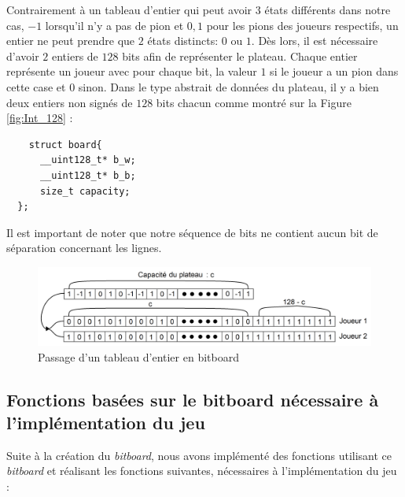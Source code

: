 \documentclass[a4paper,11pt]{article}
\begin{document}
\bigbreak

Contrairement à un tableau d'entier qui peut avoir $3$ états différents dans notre cas, $-1$ lorsqu'il n'y a pas de pion et $0,1$ pour les pions des joueurs respectifs, un entier ne peut prendre que $2$ états distincts: $0$ ou $1$. Dès lors, il est nécessaire d'avoir $2$ entiers de $128$ bits afin de représenter le plateau. Chaque entier représente un joueur avec pour chaque bit, la valeur $1$ si le joueur a un pion dans cette case et $0$ sinon. Dans le type abstrait de données du plateau, il y a bien deux entiers non signés de $128$ bits chacun comme montré sur la Figure \ref{fig:Int_128} :

\begin{lstlisting}
    struct board{
      __uint128_t* b_w;
      __uint128_t* b_b;
      size_t capacity;
  };
\end{lstlisting}
\label{lst:struct_board}

Il est important de noter que notre séquence de bits ne contient aucun bit de séparation concernant les lignes.

\begin{figure}[h]
    \centering
    \includegraphics[scale=0.20]{Board_ligne_en_int.png}
    \caption{Passage d'un tableau d'entier en bitboard}
    \label{fig:Tabtobitboard}
\end{figure}


\subsection{Fonctions basées sur le bitboard nécessaire à l'implémentation du jeu}
\label{subsct:fct_bitboard}

Suite à la création du \textit{bitboard}, nous avons implémenté des fonctions utilisant ce \textit{bitboard} et réalisant les fonctions suivantes, nécessaires à l'implémentation du jeu :
\end{document}
